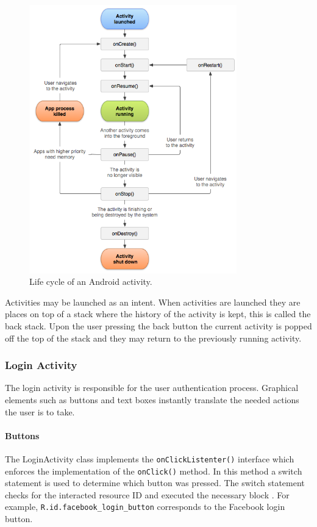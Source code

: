 \documentclass[a4paper, 11pt]{article}
\begin{document}
\begin{figure}[!hp]
\centering
\includegraphics[width=9cm]{activity_lifecycle}
\caption{Life cycle of an Android activity.} \label{fig:activity_lifecycle}
\end{figure}

Activities may be launched as an intent. When activities are launched they are places on top of a stack where the history of the activity is kept, this is called the back stack. Upon the user pressing the back button the current activity is popped off the top of the stack and they may return to the previously running activity. 


\subsubsection{Login Activity}
The login activity is responsible for the user authentication process. Graphical elements such as buttons and text boxes instantly translate the needed actions the user is to take. 

\paragraph{Buttons}
The LoginActivity class implements the \texttt{onClickListenter()} interface which enforces the implementation of the \texttt{onClick()} method. In this method a switch statement is used to determine which button was pressed. The switch statement checks for the interacted resource ID and executed the necessary block . For example, \texttt{R.id.facebook\_login\_button} corresponds to the Facebook login button. 
\end{document}
